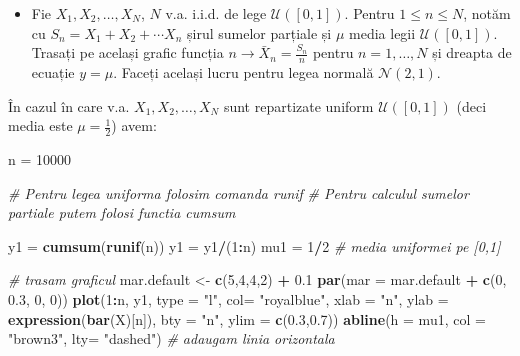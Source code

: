 \documentclass[]{article}
\newenvironment{Shaded}{\begin{snugshade}}{\end{snugshade}}
\newcommand{\KeywordTok}[1]{\textcolor[rgb]{0.13,0.29,0.53}{\textbf{#1}}}
\newcommand{\DataTypeTok}[1]{\textcolor[rgb]{0.13,0.29,0.53}{#1}}
\newcommand{\DecValTok}[1]{\textcolor[rgb]{0.00,0.00,0.81}{#1}}
\newcommand{\FloatTok}[1]{\textcolor[rgb]{0.00,0.00,0.81}{#1}}
\newcommand{\StringTok}[1]{\textcolor[rgb]{0.31,0.60,0.02}{#1}}
\newcommand{\CommentTok}[1]{\textcolor[rgb]{0.56,0.35,0.01}{\textit{#1}}}
\newcommand{\OperatorTok}[1]{\textcolor[rgb]{0.81,0.36,0.00}{\textbf{#1}}}
\newcommand{\NormalTok}[1]{#1}
\newenvironment{frshaded*}{%
  \def\FrameCommand{\fboxrule=\FrameRule\fboxsep=\FrameSep \fcolorbox{framecolor}{shadecolor1}}%
  \MakeFramed {\advance\hsize-\width \FrameRestore}}%
{\endMakeFramed}
\newenvironment{rmdblock}[1]
  {\begin{frshaded*}
  \begin{itemize}
  \renewcommand{\labelitemi}{
    \raisebox{-.7\height}[0pt][0pt]{
      {\setkeys{Gin}{width=2em,keepaspectratio}\texttt{[image: images/icons/\#1]}}
    }
  }
  \item
  }
  {
  \end{itemize}
  \end{frshaded*}
  }
\newenvironment{rmdexercise}
  {\begin{rmdblock}{exercise}}
  {\end{rmdblock}}
\begin{document}
\begin{rmdexercise}
Fie \(X_1,X_2,\dots,X_N\), \(N\) v.a. i.i.d. de lege
\(\mathcal{U}([0,1])\). Pentru \(1\leq n\leq N\), notăm cu
\(S_n=X_1+X_2+\cdots X_n\) șirul sumelor parțiale și \(\mu\) media legii
\(\mathcal{U}([0,1])\). Trasați pe același grafic funcția
\(n\to \bar{X}_n=\frac{S_n}{n}\) pentru \(n=1,\dots,N\) și dreapta de
ecuație \(y=\mu\). Faceți același lucru pentru legea normală
\(\mathcal{N}(2,1)\).
\end{rmdexercise}

În cazul în care v.a. \(X_1,X_2,\dots,X_N\) sunt repartizate uniform
\(\mathcal{U}([0,1])\) (deci media este \(\mu=\frac{1}{2}\)) avem:

\begin{Shaded}
\begin{Highlighting}[]
\NormalTok{n =}\StringTok{ }\DecValTok{10000}

\CommentTok{# Pentru legea uniforma folosim comanda runif}
\CommentTok{# Pentru calculul sumelor partiale putem folosi functia cumsum}

\NormalTok{y1 =}\StringTok{ }\KeywordTok{cumsum}\NormalTok{(}\KeywordTok{runif}\NormalTok{(n))}
\NormalTok{y1 =}\StringTok{ }\NormalTok{y1}\OperatorTok{/}\NormalTok{(}\DecValTok{1}\OperatorTok{:}\NormalTok{n)}
\NormalTok{mu1 =}\StringTok{ }\DecValTok{1}\OperatorTok{/}\DecValTok{2} \CommentTok{# media uniformei pe [0,1]}

\CommentTok{# trasam graficul }
\NormalTok{mar.default <-}\StringTok{ }\KeywordTok{c}\NormalTok{(}\DecValTok{5}\NormalTok{,}\DecValTok{4}\NormalTok{,}\DecValTok{4}\NormalTok{,}\DecValTok{2}\NormalTok{) }\OperatorTok{+}\StringTok{ }\FloatTok{0.1}
\KeywordTok{par}\NormalTok{(}\DataTypeTok{mar =}\NormalTok{ mar.default }\OperatorTok{+}\StringTok{ }\KeywordTok{c}\NormalTok{(}\DecValTok{0}\NormalTok{, }\FloatTok{0.3}\NormalTok{, }\DecValTok{0}\NormalTok{, }\DecValTok{0}\NormalTok{)) }
\KeywordTok{plot}\NormalTok{(}\DecValTok{1}\OperatorTok{:}\NormalTok{n, y1, }\DataTypeTok{type =} \StringTok{"l"}\NormalTok{, }
     \DataTypeTok{col=} \StringTok{"royalblue"}\NormalTok{, }\DataTypeTok{xlab =} \StringTok{"n"}\NormalTok{, }
     \DataTypeTok{ylab =} \KeywordTok{expression}\NormalTok{(}\KeywordTok{bar}\NormalTok{(X)[n]), }
     \DataTypeTok{bty =} \StringTok{"n"}\NormalTok{,}
     \DataTypeTok{ylim =} \KeywordTok{c}\NormalTok{(}\FloatTok{0.3}\NormalTok{,}\FloatTok{0.7}\NormalTok{))}
\KeywordTok{abline}\NormalTok{(}\DataTypeTok{h =}\NormalTok{ mu1, }\DataTypeTok{col =} \StringTok{"brown3"}\NormalTok{, }\DataTypeTok{lty=} \StringTok{"dashed"}\NormalTok{) }\CommentTok{# adaugam linia orizontala}
\end{Highlighting}
\end{Shaded}
\end{document}
